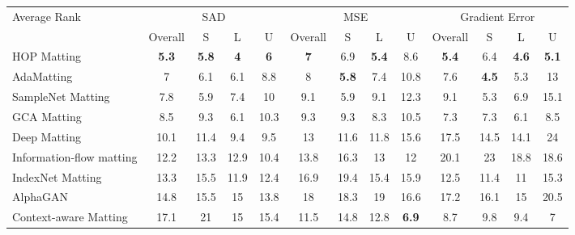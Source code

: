 	
	\begin{table}[t]
	\centering
	\begin{tabular}{l|c|ccc|c|ccc|c|ccc}
		\toprule
		\multirow{2}{*}{Average Rank} & \multicolumn{4}{c|}{SAD}& \multicolumn{4}{c|}{MSE}& \multicolumn{4}{c}{Gradient Error}\\
		& Overall&S&L&U& Overall&S&L&U& Overall&S&L&U\\
		\midrule
		HOP Matting&	\textbf{5.3}&	\textbf{5.8}	&\textbf{4}&	\textbf{6}&	\textbf{7}&	6.9&\textbf{5.4}	&8.6&\textbf{5.4}	&6.4&	\textbf{4.6}&	\textbf{5.1} \\		
		AdaMatting\cite{cai2019disentangled} &7&	6.1	&6.1&	8.8 &8&	\textbf{5.8}	&7.4&	10.8&7.6&	\textbf{4.5}&	5.3&	13\\		
		SampleNet Matting\cite{samplenet} &	7.8&5.9&	7.4&	10 &	9.1	&5.9&	9.1	&12.3&	9.1	&5.3&	6.9	&15.1\\		
		GCA Matting	&8.5&	9.3	&6.1&	10.3&9.3	&9.3&	8.3	&10.5&7.3&	7.3&	6.1&	8.5	 \\		
		Deep Matting\cite{xu2017deep}&10.1&	11.4&	9.4	&9.5&13	&11.6&	11.8&	15.6	&17.5&	14.5&	14.1&	24\\		
		Information-flow matting \cite{aksoy2017designing}&12.2&	13.3&	12.9&	10.4&13.8&	16.3&	13&	12&	20.1&	23	&18.8&	18.6\\		
		IndexNet Matting\cite{lu2019indices}&13.3&	15.5&	11.9&	12.4	&16.9&	19.4&	15.4&	15.9	&12.5&	11.4&	11&	15.3	\\		
		AlphaGAN\cite{cai2019disentangled}&14.8&	15.5&	15&	13.8&18&	18.3&	19&	16.6&17.2&	16.1&	15&	20.5\\
		Context-aware Matting\cite{hou2019context}&	17.1&	21&	15&	15.4&11.5&	14.8&	12.8	&\textbf{6.9}&8.7&	9.8&	9.4	&7	\\	
		\bottomrule
	\end{tabular}
	\label{tab5:alphamatting}
	\end{table}

	

